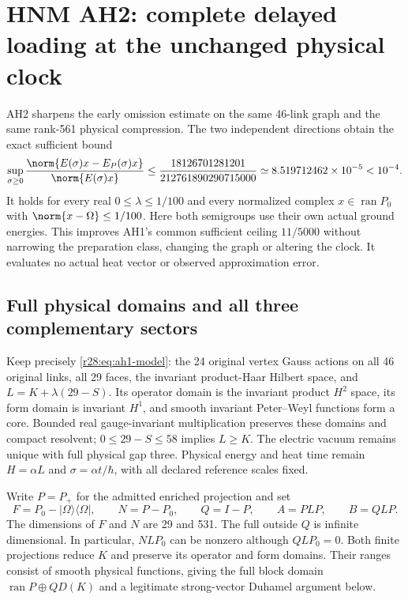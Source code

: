 \section{HNM AH2: complete delayed loading at the unchanged physical clock\workstar}
AH2 sharpens the early omission estimate on the same 46-link graph and the same rank-561 physical compression. The two independent directions obtain the exact sufficient bound
\begin{equation}
 \sup_{\sigma\ge0}
 \frac{\norm{E(\sigma)x-E_P(\sigma)x}}{\norm{E(\sigma)x}}
 \le \frac{18126701281201}{212761890290715000}
 \simeq 8.519712462\times10^{-5}<10^{-4}.
 \label{r28:eq:ah2-result}
\end{equation}
It holds for every real $0\le\lambda\le1/100$ and every normalized complex $x\in\operatorname{ran}P_0$ with $\norm{x-\Omega}\le1/100$. Here both semigroups use their own actual ground energies. This improves AH1's common sufficient ceiling $11/5000$ without narrowing the preparation class, changing the graph or altering the clock. It evaluates no actual heat vector or observed approximation error.

\subsection{Full physical domains and all three complementary sectors}
Keep precisely \eqref{r28:eq:ah1-model}: the 24 original vertex Gauss actions on all 46 original links, all 29 faces, the invariant product-Haar Hilbert space, and $L=K+\lambda(29-S)$. Its operator domain is the invariant product $H^2$ space, its form domain is invariant $H^1$, and smooth invariant Peter--Weyl functions form a core. Bounded real gauge-invariant multiplication preserves these domains and compact resolvent; $0\le29-S\le58$ implies $L\ge K$. The electric vacuum remains unique with full physical gap three. Physical energy and heat time remain $H=\alpha L$ and $\sigma=\alpha t/\hbar$, with all declared reference scales fixed.

Write $P=P_+$ for the admitted enriched projection and set
\begin{equation}
 F=P_0-|\Omega\rangle\langle\Omega|,\qquad
 N=P-P_0,\qquad Q=I-P,\qquad A=PLP,\qquad B=QLP.
 \label{r28:eq:ah2-sectors}
\end{equation}
The dimensions of $F$ and $N$ are 29 and 531. The full outside $Q$ is infinite dimensional. In particular, $NLP_0$ can be nonzero although $QLP_0=0$. Both finite projections reduce $K$ and preserve its operator and form domains. Their ranges consist of smooth physical functions, giving the full block domain $\operatorname{ran}P\oplus QD(K)$ and a legitimate strong-vector Duhamel argument below.

